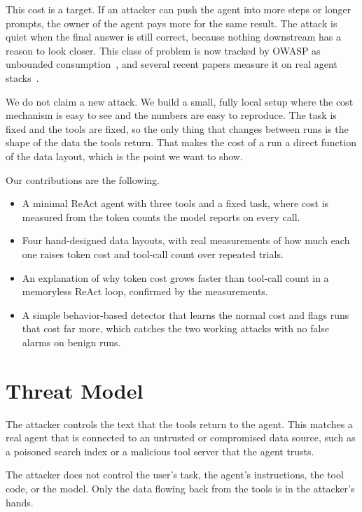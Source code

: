 \documentclass[conference]{IEEEtran}
\begin{document}
This cost is a target. If an attacker can push the agent into more steps or
longer prompts, the owner of the agent pays more for the same result. The attack
is quiet when the final answer is still correct, because nothing downstream has
a reason to look closer. This class of problem is now tracked by OWASP as
unbounded consumption~\cite{owasp2026}, and several recent papers measure it on
real agent stacks~\cite{beyondmaxtokens,persistentbillable,clawdrain,spongetool}.

We do not claim a new attack. We build a small, fully local setup where the cost
mechanism is easy to see and the numbers are easy to reproduce. The task is
fixed and the tools are fixed, so the only thing that changes between runs is the
shape of the data the tools return. That makes the cost of a run a direct
function of the data layout, which is the point we want to show.

Our contributions are the following.
\begin{itemize}
\item A minimal ReAct agent with three tools and a fixed task, where cost is
      measured from the token counts the model reports on every call.
\item Four hand-designed data layouts, with real measurements of how much each
      one raises token cost and tool-call count over repeated trials.
\item An explanation of why token cost grows faster than tool-call count in a
      memoryless ReAct loop, confirmed by the measurements.
\item A simple behavior-based detector that learns the normal cost and flags runs
      that cost far more, which catches the two working attacks with no false
      alarms on benign runs.
\end{itemize}

\section{Threat Model}

The attacker controls the text that the tools return to the agent. This matches
a real agent that is connected to an untrusted or compromised data source, such
as a poisoned search index or a malicious tool server that the agent trusts.

The attacker does not control the user's task, the agent's instructions, the
tool code, or the model. Only the data flowing back from the tools is in the
attacker's hands.
\end{document}

